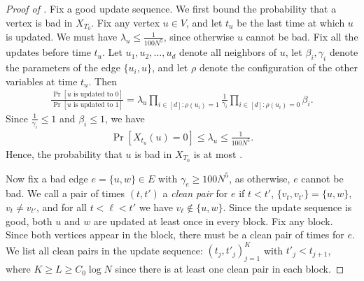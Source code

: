 \documentclass[11pt]{amsart}
\renewcommand{\Pr}{\mathop{\mathrm{Pr}}\nolimits}
\theoremstyle{definition}
\theoremstyle{remark}
\begin{document}
\begin{proof}[Proof of ]
Fix a good update sequence.
We first bound the probability that a vertex is bad in $X_{T_0}$. Fix any vertex $u \in V$, and let $t_u$ be the last time at which $u$ is updated. We must have $\lambda_u \leq \frac{1}{100N^5}$, since otherwise $u$ cannot be bad. Fix all the updates before time $t_u$. Let $u_1,u_2,\ldots,u_d$ denote all neighbors of $u$, let $\beta_i,\gamma_i$ denote the parameters of the edge $\{u_i,u\}$, and let $\rho$ denote the configuration of the other variables at time $t_u$. Then
\begin{align}\label{eq:lambda-u-bound}
 \frac{\Pr[ u \text{ is updated to } 0]}{\Pr[u \text{ is updated to }1]} = \lambda_u \prod_{i \in [d]: \rho(u_i) = 1} \frac{1}{\gamma_i}\prod_{i \in [d]: \rho(u_i) = 0} \beta_i.
\end{align}
Since $\frac{1}{\gamma_i} \leq 1$ and $\beta_i \leq 1$, we have
\begin{align*}
 \Pr[X_{t_u}(u) = 0] \leq \lambda_u \leq \frac{1}{100N^5}.
\end{align*}
Hence, the probability that $u$ is bad in $X_{T_0}$ is at most .

Now fix a bad edge $e = \{u,w\} \in E$ with  $\gamma_e \geq 100N^5$, as otherwise, $e$ cannot be bad.
We call a pair of times $(t,t')$ a \emph{clean pair} for $e$ if $t < t'$, $\{v_t,v_{t'}\} = \{u,w\}$, $v_t \neq v_{t'}$, and for all $t < \ell < t'$ we have $v_\ell \notin \{u,w\}$.
Since the update sequence is good, both $u$ and $w$ are updated at least once in every block. Fix any block. %
Since both vertices appear in the block, there must be a clean pair of times for $e$. 
We list all clean pairs in the update sequence: $(t_j,t'_j)_{j=1}^K$ with $t'_j < t_{j+1}$,
where $K \geq L \geq C_0 \log N$ since there is at least one clean pair in each block.


\end{proof}
\end{document}
